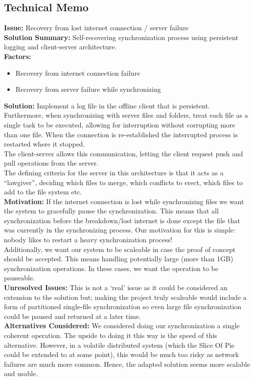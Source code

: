 \subsection{Technical Memo}
\label{technicalmemo}
\textbf{Issue:} Recovery from lost internet connection / server failure\\
\textbf{Solution Summary:} Self-recovering synchronization process using persistent logging and client-server architecture.\\
\textbf{Factors:} 
\begin{itemize}
\item Recovery from internet connection failure
\item Recovery from server failure while synchronizing
\end{itemize}
\textbf{Solution:}
Implement a log file in the offline client that is persistent. Furthermore, when synchronizing with server files and folders, treat each file as a single task to be executed, allowing for interruption without corrupting more than one file. When the connection is re-established the interrupted process is restarted where it stopped.\\
The client-server allows this communication, letting the client request push and pull operations from the server.\\
The defining criteria for the server in this architecture is that it acts as a “lawgiver”, deciding which files to merge, which conflicts to erect, which files to add to the file system etc.\\
\newline
\textbf{Motivation:} If the internet connection is lost while synchronizing files we want the system to gracefully pause the synchronization. This means that all synchronization before the breakdown/lost internet is done except the file that was currently in the synchronizing process. Our motivation for this is simple: nobody likes to restart a heavy synchronization process!\\
Additionally, we want our system to be scaleable in case the proof of concept should be accepted. This means handling potentially large (more than 1GB) synchronization operations. In these cases, we want the operation to be pauseable.\\
\newline
\textbf{Unresolved Issues:}
This is not a ‘real’ issue as it could be considered an extension to the solution but; making the project truly scaleable would include a form of partitioned single-file synchronization so even large file synchronization could be paused and returned at a later time.\\
\newline
\textbf{Alternatives Considered:} We considered doing our synchronization a single coherent operation. The upside to doing it this way is the speed of this alternative. However, in a volatile distributed system (which the Slice Of Pie could be extended to at some point), this would be much too risky as network failures are much more common. Hence, the adapted solution seems more scalable and usable.
\newpage